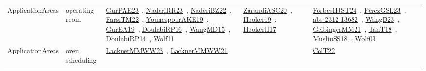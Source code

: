 {\begin{longtable}{lp{3cm}>{\raggedright\arraybackslash}p{6cm}>{\raggedright\arraybackslash}p{6cm}>{\raggedright\arraybackslash}p{8cm}}
ApplicationAreas & operating room & \href{works/GurPAE23.pdf}{GurPAE23}~\cite{GurPAE23}, \href{works/NaderiRR23.pdf}{NaderiRR23}~\cite{NaderiRR23}, \href{works/NaderiBZ22.pdf}{NaderiBZ22}~\cite{NaderiBZ22}, \href{works/FarsiTM22.pdf}{FarsiTM22}~\cite{FarsiTM22}, \href{works/YounespourAKE19.pdf}{YounespourAKE19}~\cite{YounespourAKE19}, \href{works/GurEA19.pdf}{GurEA19}~\cite{GurEA19}, \href{works/DoulabiRP16.pdf}{DoulabiRP16}~\cite{DoulabiRP16}, \href{works/WangMD15.pdf}{WangMD15}~\cite{WangMD15}, \href{works/DoulabiRP14.pdf}{DoulabiRP14}~\cite{DoulabiRP14}, \href{works/Wolf11.pdf}{Wolf11}~\cite{Wolf11} & \href{works/ZarandiASC20.pdf}{ZarandiASC20}~\cite{ZarandiASC20}, \href{works/Hooker19.pdf}{Hooker19}~\cite{Hooker19}, \href{works/HookerH17.pdf}{HookerH17}~\cite{HookerH17} & \href{works/ForbesHJST24.pdf}{ForbesHJST24}~\cite{ForbesHJST24}, \href{works/PerezGSL23.pdf}{PerezGSL23}~\cite{PerezGSL23}, \href{works/abs-2312-13682.pdf}{abs-2312-13682}~\cite{abs-2312-13682}, \href{works/WangB23.pdf}{WangB23}~\cite{WangB23}, \href{works/GeibingerMM21.pdf}{GeibingerMM21}~\cite{GeibingerMM21}, \href{works/TanT18.pdf}{TanT18}~\cite{TanT18}, \href{works/MusliuSS18.pdf}{MusliuSS18}~\cite{MusliuSS18}, \href{works/Wolf09.pdf}{Wolf09}~\cite{Wolf09}\\
ApplicationAreas & oven scheduling & \href{works/LacknerMMWW23.pdf}{LacknerMMWW23}~\cite{LacknerMMWW23}, \href{works/LacknerMMWW21.pdf}{LacknerMMWW21}~\cite{LacknerMMWW21} &  & \href{works/ColT22.pdf}{ColT22}~\cite{ColT22}\\

\end{longtable}}
